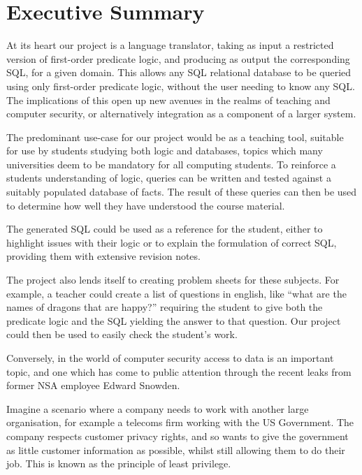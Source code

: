 \documentclass[a4paper, 11pt]{article}
\begin{document}
\setlength{\parskip}{0.3cm} \setlength{\parindent}{0cm}

\section{Executive Summary}
  At its heart our project is a language translator, taking as input a
  restricted version of first-order predicate logic, and producing as output
  the corresponding SQL, for a given domain. This allows any SQL relational
  database to be queried using only first-order predicate logic, without the
  user needing to know any SQL. The implications of this open up
  new avenues in the realms of teaching and computer security, or
  alternatively integration as a component of a larger system.

  The predominant use-case for our project would be as a teaching tool,
  suitable for use by students studying both logic and databases, topics which
  many universities deem to be mandatory for all computing students. To
  reinforce a students understanding of logic, queries can be written and tested
  against a suitably populated database of facts. The result of these queries
  can then be used to determine how well they have understood the course
  material.

  The generated SQL could be used as a reference for the student, either to
  highlight issues with their logic or to explain the formulation of correct
  SQL, providing them with extensive revision notes.

  The project also lends itself to creating problem sheets for these subjects.
  For example, a teacher could create a list of questions in english, like
  ``what are the names of dragons that are happy?'' requiring the student to
  give both the predicate logic and the SQL yielding the answer to that
  question. Our project could then be used to easily check the student's work.


  Conversely, in the world of computer security access to data is an important
  topic, and one which has come to public attention through the recent leaks
  from former NSA employee Edward Snowden.

  Imagine a scenario where a company needs to work with another large
  organisation, for example a telecoms firm working with the US Government. The
  company respects customer privacy rights, and so wants to give the government
  as little customer information as possible, whilst still allowing them to do
  their job. This is known as the principle of least privilege.
\end{document}
